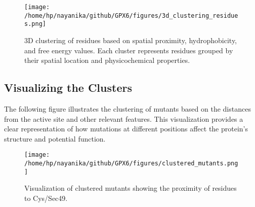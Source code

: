 \documentclass{article}
\begin{document}
\begin{figure}[H]
    \centering
    \texttt{[image: /home/hp/nayanika/github/GPX6/figures/3d\_clustering\_residues.png]} %
    \caption{3D clustering of residues based on spatial proximity, hydrophobicity, and free energy values. Each cluster represents residues grouped by their spatial location and physicochemical properties.}
    \label{fig:3d_clustering}
\end{figure}

\FloatBarrier %

\subsection{Visualizing the Clusters}

The following figure illustrates the clustering of mutants based on the distances from the active site and other relevant features. This visualization provides a clear representation of how mutations at different positions affect the protein’s structure and potential function.

\begin{figure}[H]
    \centering
    \texttt{[image: /home/hp/nayanika/github/GPX6/figures/clustered\_mutants.png]} %
    \caption{Visualization of clustered mutants showing the proximity of residues to Cys/Sec49.}
    \label{fig:clustered_mutants}
\end{figure}
\end{document}

